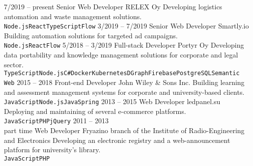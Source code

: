 \documentclass[9pt]{developercv} %
\begin{document}
\begin{entrylist}
	\entry
		{7/2019 -- present}
		{Senior Web Developer}
		{RELEX Oy}
		{Developing logistics automation and waste management solutions.\\ \texttt{Node.js}\slashsep\texttt{React}\slashsep\texttt{TypeScript}\slashsep\texttt{Flow}}
	\entry
		{3/2019 -- 7/2019}
		{Senior Web Developer}
		{Smartly.io}
		{Building automation solutions for targeted ad campaigns.\\ \texttt{Node.js}\slashsep\texttt{React}\slashsep\texttt{Flow}}
	\entry
		{5/2018 -- 3/2019}
		{Full-stack Developer}
		{Portyr Oy}
		{Developing data portability and knowledge management solutions for corporate and legal sector.\\ \texttt{TypeScript}\slashsep\texttt{Node.js}\slashsep\texttt{C\#}\slashsep\texttt{Docker}\slashsep\texttt{Kubernetes}\slashsep\texttt{DGraph}\slashsep\texttt{Firebase}\slashsep\texttt{PostgreSQL}\slashsep\texttt{Semantic Web}}
	\entry
		{2015 -- 2018}
		{Front-end Developer}
		{John Wiley \& Sons Inc.}
		{Building learning and assessment management systems for corporate and university-based clients.\\ \texttt{JavaScript}\slashsep\texttt{Node.js}\slashsep\texttt{Java}\slashsep\texttt{Spring}}
	\entry
		{2013 -- 2015}
		{Web Developer}
		{ledpanel.su}
		{Deploying and maintaining of several e-commerce platforms.\\ \texttt{JavaScript}\slashsep\texttt{PHP}\slashsep\texttt{jQuery}}
	\entry
		{2011 -- 2013\\\footnotesize{part time}}
		{Web Developer}
		{Fryazino branch of the Institute of Radio-Engineering and Electronics}
		{Developing an electronic registry and a web-announcement platform for university's library.\\ \texttt{JavaScript}\slashsep\texttt{PHP}}
\end{entrylist}

\end{document}
